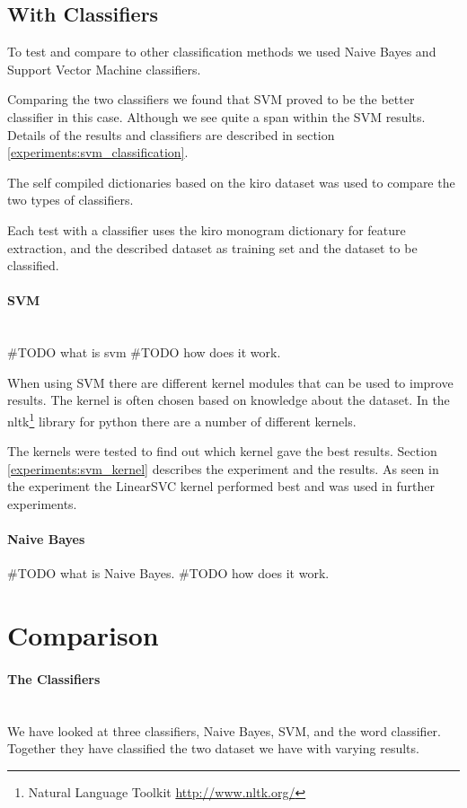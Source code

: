 \subsection{With Classifiers}\label{sentiment:classifier_classification}
To test and compare to other classification methods we used Naive Bayes and
Support Vector Machine classifiers. 

Comparing the two classifiers we found that SVM proved to be the better
classifier in this case. Although we see quite a span within the SVM results.
Details of the results and classifiers are described in section
\ref{experiments:svm_classification}. 

The self compiled dictionaries based on the kiro dataset was used to compare
the two types of classifiers. 

Each test with a classifier uses the kiro monogram dictionary for feature
extraction, and the described dataset as training set and the dataset to be
classified. 

\paragraph{SVM}\label{sentiment:svm_classification}
\hspace{0pt}\\
#TODO what is svm  
#TODO how does it work.

When using SVM there are different kernel modules that can be used
to improve results. The kernel is often chosen based on knowledge about the
dataset. In the nltk\footnote{Natural Language Toolkit
\url{http://www.nltk.org/}} library for python there are a number of different
kernels. 

The kernels were tested to find out which kernel gave the best results. Section
\ref{experiments:svm_kernel} describes the experiment and the results. As
seen in the experiment the LinearSVC kernel performed best and was used in
further experiments.
%

\paragraph{Naive Bayes}\label{sentiment:naive_bayes_classification}
#TODO what is Naive Bayes. 
#TODO how does it work.
%

\section{Comparison}\label{sentiment:comparison_results}
\paragraph{The Classifiers}
\hspace{0pt}\\
We have looked at three classifiers, Naive Bayes, SVM, and the word classifier.
Together they have classified the two dataset we have with varying results. 

